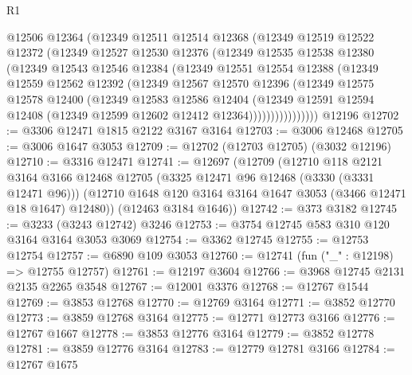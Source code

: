\begin{lexlean}{R1}
\begin{coremodule}
            @12506
            @12364
            (@12349
              @12511
              @12514
              @12368
              (@12349
                @12519
                @12522
                @12372
                (@12349
                  @12527
                  @12530
                  @12376
                  (@12349
                    @12535
                    @12538
                    @12380
                    (@12349
                      @12543
                      @12546
                      @12384
                      (@12349
                        @12551
                        @12554
                        @12388
                        (@12349
                          @12559
                          @12562
                          @12392
                          (@12349
                            @12567
                            @12570
                            @12396
                            (@12349
                              @12575
                              @12578
                              @12400
                              (@12349
                                @12583
                                @12586
                                @12404
                                (@12349
                                  @12591
                                  @12594
                                  @12408
                                  (@12349 @12599 @12602 @12412 @12364))))))))))))))))
    @12196
@12702 := @3306 @12471 @1815 @2122 @3167 @3164
@12703 := @3006 @12468
@12705 := @3006 @1647 @3053
@12709 := @12702 (@12703 @12705) (@3032 @12196)
@12710 := @3316 @12471
@12741 := @12697
    (@12709
      (@12710
        @118
        @2121
        @3164
        @3166
        @12468
        @12705
        (@3325 @12471 @96 @12468 (@3330 (@3331 @12471 @96)))
        (@12710 @1648 @120 @3164 @3164 @1647 @3053 (@3466 @12471 @18 @1647) @12480))
      (@12463 @3184 @1646))
@12742 := @373 @3182
@12745 := @3233 (@3243 @12742) @3246
@12753 := @3754 @12745 @583 @310 @120 @3164 @3164 @3053 @3069
@12754 := @3362 @12745
@12755 := @12753 @12754
@12757 := @6890 @109 @3053
@12760 := @12741 (fun ("_" : @12198) => @12755 @12757)
@12761 := @12197 @3604
@12766 := @3968 @12745 @2131 @2135 @2265 @3548
@12767 := @12001 @3376
@12768 := @12767 @1544
@12769 := @3853 @12768
@12770 := @12769 @3164
@12771 := @3852 @12770
@12773 := @3859 @12768 @3164
@12775 := @12771 @12773 @3166
@12776 := @12767 @1667
@12778 := @3853 @12776 @3164
@12779 := @3852 @12778
@12781 := @3859 @12776 @3164
@12783 := @12779 @12781 @3166
@12784 := @12767 @1675

\end{coremodule}
\end{lexlean}
